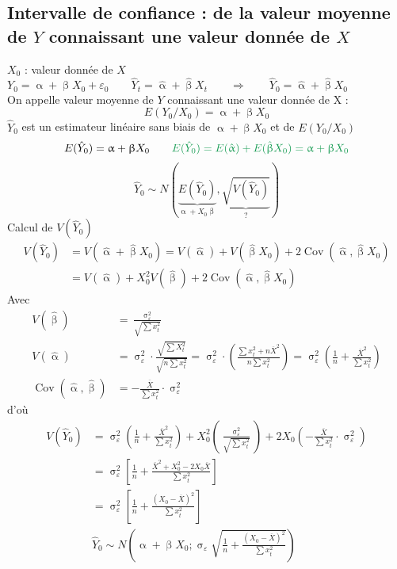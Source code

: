 \documentclass{article}
\newcommand{\hbeta}{\hat{\upbeta}}
\newcommand{\halpha}{\hat{\upalpha}}
\newcommand{\sig}{\upsigma_\varepsilon^2}
\begin{document}
 \subsection{Intervalle de confiance : de la valeur moyenne de $Y$ connaissant une valeur donnée de $X$}
 $X_0$ : valeur donnée de $X$\\
 $Y_0 = \upalpha + \upbeta X_0 + \varepsilon_0 \qquad \hat{Y}_t = \halpha + \hbeta X_t \qquad \Rightarrow \qquad \hat{Y}_0  = \halpha + \hbeta X_0$ \\
 On appelle valeur moyenne de $Y$ connaissant une valeur donnée de X : 
 \[E\left(Y_0/X_0\right) = \upalpha + \upbeta X_0\]
 $\hat{Y}_0$ est un estimateur linéaire sans biais de $\upalpha + \upbeta X_0$ et de $E\left(Y_0/X_0\right)$
 \[E(\hat{Y}_0) = \upalpha + \upbeta X_0 \qquad {\color{ForestGreen}E(\hat{Y}_0) = E(\halpha) + E(\hbeta X_0) = \upalpha + \upbeta X_0}\]
 \[\hat{Y}_0 \sim N\left(\underbrace{E\left(\hat{Y}_0\right)}_{\upalpha + X_0 \upbeta}, \underbrace{\sqrt{V\left(\hat{Y}_0\right)}}_?\right)\]
 Calcul de $V(\hat{Y}_0)$
 \begin{equation*}
 	\begin{split}
 	V(\hat{Y}_0) &= V(\halpha + \hbeta	X_0) = V(\halpha) + V(\hbeta X_0) + 2 \operatorname{Cov} (\halpha, \hbeta X_0) \\
 	&= V(\halpha) + X_0^2 V(\hbeta) + 2 \operatorname{Cov} (\halpha, \hbeta X_0) 	
 	\end{split}
 \end{equation*}
 Avec
 \begin{equation*}
 \begin{split}
 V(\hbeta) &= \frac{\sig}{\sqrt{\sum x_t^2}} \\
 V(\halpha) &= \sig \cdot \frac{\sqrt{\sum X_t^2}}{\sqrt{n \sum x_t^2}} = \sig \cdot \left(\frac{\sum x_t^2 + n \overline{X}^2}{n \sum x_t^2}\right) = \sig \left(\frac{1}{n} + \frac{\overline{X}^2}{\sum x_t^2}\right) \\
 \operatorname{Cov} (\halpha, \hbeta) &= - \frac{\overline{X}}{\sum x_t^2} \cdot \sig 	
 \end{split}
 \end{equation*}
 d'où
 \begin{equation*}
 	\begin{split}
		V(\hat{Y}_0) &= \sig \left(\frac{1}{n} + \frac{\overline{X}^2}{\sum x_t^2}\right) + X_0^2 \left(\frac{\sig}{\sqrt{\sum x_t^2}}\right) + 2 X_0 \left(- \frac{\overline{X}}{\sum x_t^2} \cdot \sig 	\right) \\
		&= \sig \left[\frac{1}{n} + \frac{\overline{X}^2 + X_0^2 - 2 X_0\overline{X}}{\sum x_t^2}\right] \\
		&= \sig \left[\frac{1}{n} + \frac{(X_0-\overline{X})^2}{\sum x_t^2}\right] \\
		&\boxed{\hat{Y}_0 \sim N \left(\upalpha + \upbeta X_0 ;  \upsigma_\varepsilon \sqrt{\frac{1}{n} + \frac{(X_0-\overline{X})^2}{\sum x_t^2}}\right)}
 	\end{split}
 \end{equation*}
\end{document}
